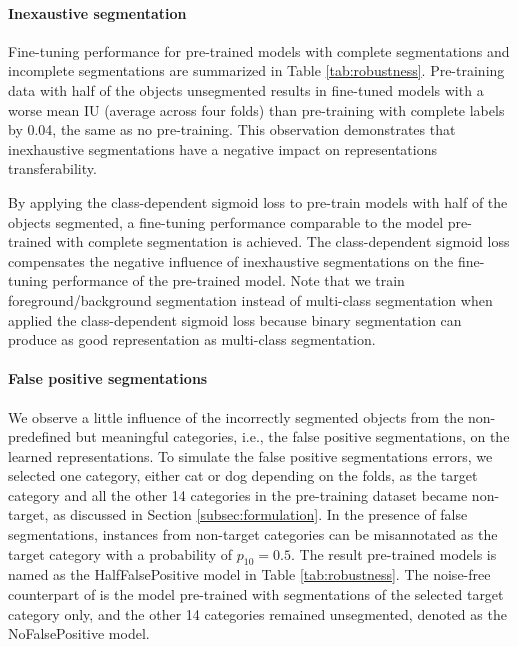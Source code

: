 \paragraph{Inexaustive segmentation}
Fine-tuning performance for pre-trained models with complete segmentations and incomplete segmentations are summarized in Table \ref{tab:robustness}.
Pre-training data with half of the objects unsegmented results in fine-tuned models with a worse mean IU (average across four folds) than pre-training with complete labels by 0.04, the same as no pre-training.
This observation demonstrates that inexhaustive segmentations have a negative impact on representations transferability.

By applying the class-dependent sigmoid loss to pre-train models with half of the objects segmented, a fine-tuning performance comparable to the model pre-trained with complete segmentation is achieved.
The class-dependent sigmoid loss compensates the negative influence of inexhaustive segmentations on the fine-tuning performance of the pre-trained model.
Note that we train foreground/background segmentation instead of multi-class segmentation when applied the class-dependent sigmoid loss because binary segmentation can produce as good representation as multi-class segmentation.


\paragraph{False positive segmentations}
We observe a little influence of the incorrectly segmented objects from the non-predefined but meaningful categories, i.e., the false positive segmentations, on the learned representations.
To simulate the false positive segmentations errors, we selected one category, either cat or dog depending on the folds, as the target category and all the other 14 categories in the pre-training dataset became non-target, as discussed in Section \ref{subsec:formulation}.
In the presence of false segmentations, instances from non-target categories can be misannotated as the target category with a probability of $p_{10}= 0.5$.
The result pre-trained models is named as the HalfFalsePositive model in Table \ref{tab:robustness}.
The noise-free counterpart of is the model pre-trained with segmentations of the selected target category only, and the other 14 categories remained unsegmented, denoted as the NoFalsePositive model.

